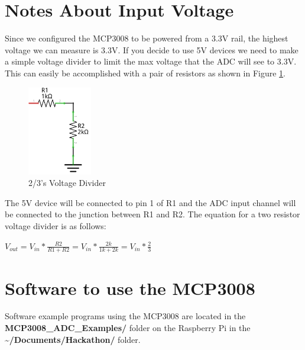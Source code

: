 \documentclass{article}
\begin{document}
\section{Notes About Input Voltage}

Since we configured the MCP3008 to be powered from a 3.3V rail, the highest voltage we can measure is 3.3V. If you decide to use 5V devices we need to make a simple voltage divider to limit the max voltage that the ADC will see to 3.3V. This can easily be accomplished with a pair of resistors as shown in Figure \ref{Voltage_Divider}.

 
	\begin{figure}[H]
		\centering
		\includegraphics[width=0.25\textwidth]{pics/Voltage_Divider.png}
		\caption{2/3's Voltage Divider}
		\label{Voltage_Divider}
	\end{figure}

The 5V device will be connected to pin 1 of R1 and the ADC input channel will be connected to the junction between R1 and R2. The equation for a two resistor voltage divider is as follows:

	\begin{center}
		\begin{math}
		V_{out} = V_{in} * \frac{R2}{R1 + R2} = V_{in} * \frac{2k}{1k + 2k} = V_{in} * \frac{2}{3}
		\end{math}
	\end{center}


\section{Software to use the MCP3008}

Software example programs using the MCP3008 are located in the \textbf{MCP3008\_ADC\_Examples/} folder on the Raspberry Pi in the \textbf{\textasciitilde/Documents/Hackathon/} folder.
\end{document}
